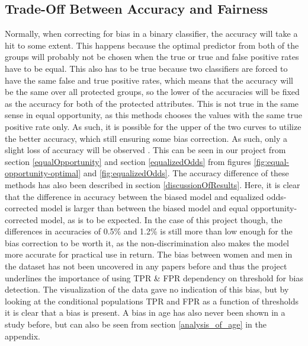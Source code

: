 \documentclass[11pt, fleqn, titlepage]{article}
\begin{document}
	\subsection{Trade-Off Between Accuracy and Fairness}\label{tradeoff}
	Normally, when correcting for bias in a binary classifier, the accuracy will take a hit to some extent. This happens because the optimal predictor from both of the groups will probably not be chosen when the true or true and false positive rates have to be equal. This also has to be true because two classifiers are forced to have the same false and true positive rates, which means that the accuracy will be the same over all protected groups, so the lower of the accuracies will be fixed as the accuracy for both of the protected attributes. This is not true in the same sense in equal opportunity, as this methods chooses the values with the same true positive rate only. As such, it is possible for the upper of the two curves to utilize the better accuracy, which still ensuring some bias correction. As such, only a slight loss of accuracy will be observed \cite{equal_of_oppor}. This can be seen in our project from section \ref{equalOpportunity} and section \ref{equalizedOdds} from figures \ref{fig:equal-opportunity-optimal} and \ref{fig:equalizedOdds}. The accuracy difference of these methods has also been described in section \ref{discussionOfResults}. Here, it is clear that the difference in accuracy between the biased model and equalized odds-corrected model is larger than between the biased model and equal opportunity-corrected model, as is to be expected. In the case of this project though, the differences in accuracies of 0.5\% and 1.2\% is still more than low enough for the bias correction to be worth it, as the non-discrimination also makes the model more accurate for practical use in return.
	The bias between women and men in the dataset has not been uncovered in any papers before and thus the project underlines the importance of using TPR \& FPR dependency on threshold for bias detection. The visualization of the data gave no indication of this bias, but by looking at the conditional populations TPR and FPR as a function of thresholds it is clear that a bias is present. A bias in age has also never been shown in a study before, but can also be seen from section \ref{analysis_of_age} in the appendix.\\\\
	\noindent	
\end{document}
